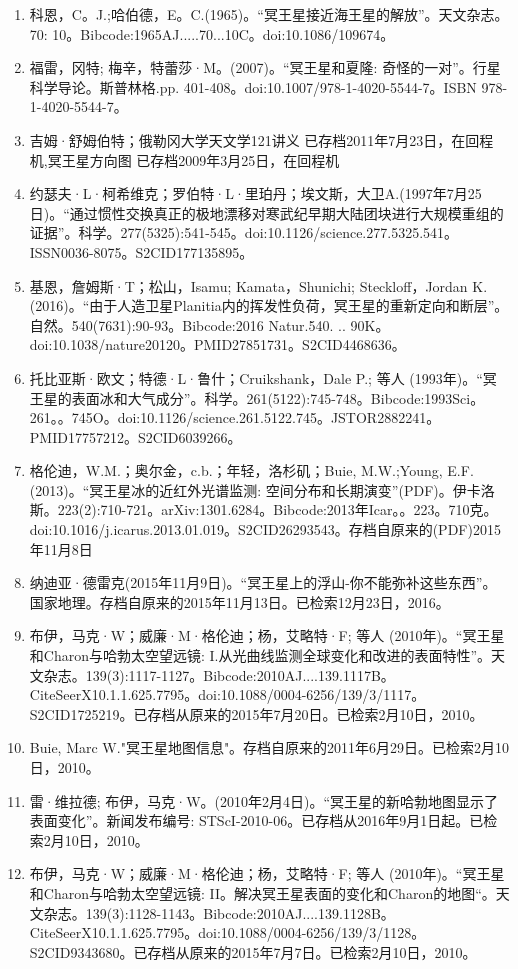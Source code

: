 \begin{enumerate}
\item 科恩，C。J.;哈伯德，E。C.(1965)。“冥王星接近海王星的解放”。天文杂志。70: 10。Bibcode:1965AJ.....70...10C。doi:10.1086/109674。
\item 福雷，冈特; 梅辛，特蕾莎·M。(2007)。“冥王星和夏隆: 奇怪的一对”。行星科学导论。斯普林格.pp. 401-408。doi:10.1007/978-1-4020-5544-7。ISBN 978-1-4020-5544-7。
\item 吉姆·舒姆伯特；俄勒冈大学天文学121讲义 已存档2011年7月23日，在回程机,冥王星方向图 已存档2009年3月25日，在回程机
\item 约瑟夫·L·柯希维克；罗伯特·L·里珀丹；埃文斯，大卫A.(1997年7月25日)。“通过惯性交换真正的极地漂移对寒武纪早期大陆团块进行大规模重组的证据”。科学。277(5325):541-545。doi:10.1126/science.277.5325.541。ISSN0036-8075。S2CID177135895。  
\item 基恩，詹姆斯·T；松山，Isamu; Kamata，Shunichi; Steckloff，Jordan K.(2016)。“由于人造卫星Planitia内的挥发性负荷，冥王星的重新定向和断层”。自然。540(7631):90-93。Bibcode:2016 Natur.540. .. 90K。doi:10.1038/nature20120。PMID27851731。S2CID4468636。  
\item 托比亚斯·欧文；特德·L·鲁什；Cruikshank，Dale P.; 等人 (1993年)。“冥王星的表面冰和大气成分”。科学。261(5122):745-748。Bibcode:1993Sci。261。。745O。doi:10.1126/science.261.5122.745。JSTOR2882241。PMID17757212。S2CID6039266。   
\item 格伦迪，W.M.；奥尔金，c.b.；年轻，洛杉矶；Buie, M.W.;Young, E.F.(2013)。“冥王星冰的近红外光谱监测: 空间分布和长期演变”(PDF)。伊卡洛斯。223(2):710-721。arXiv:1301.6284。Bibcode:2013年Icar。。223。710克。doi:10.1016/j.icarus.2013.01.019。S2CID26293543。存档自原来的(PDF)2015年11月8日  
\item 纳迪亚·德雷克(2015年11月9日)。“冥王星上的浮山-你不能弥补这些东西”。国家地理。存档自原来的2015年11月13日。已检索12月23日，2016。
\item 布伊，马克·W；威廉·M·格伦迪；杨，艾略特·F; 等人 (2010年)。“冥王星和Charon与哈勃太空望远镜: I.从光曲线监测全球变化和改进的表面特性”。天文杂志。139(3):1117-1127。Bibcode:2010AJ....139.1117B。CiteSeerX10.1.1.625.7795。doi:10.1088/0004-6256/139/3/1117。S2CID1725219。已存档从原来的2015年7月20日。已检索2月10日，2010。 
\item Buie, Marc W."冥王星地图信息"。存档自原来的2011年6月29日。已检索2月10日，2010。
\item 雷·维拉德; 布伊，马克·W。(2010年2月4日)。“冥王星的新哈勃地图显示了表面变化”。新闻发布编号: STScI-2010-06。已存档从2016年9月1日起。已检索2月10日，2010。
\item 布伊，马克·W；威廉·M·格伦迪；杨，艾略特·F; 等人 (2010年)。“冥王星和Charon与哈勃太空望远镜: II。解决冥王星表面的变化和Charon的地图“。天文杂志。139(3):1128-1143。Bibcode:2010AJ....139.1128B。CiteSeerX10.1.1.625.7795。doi:10.1088/0004-6256/139/3/1128。S2CID9343680。已存档从原来的2015年7月7日。已检索2月10日，2010。  

\end{enumerate}
